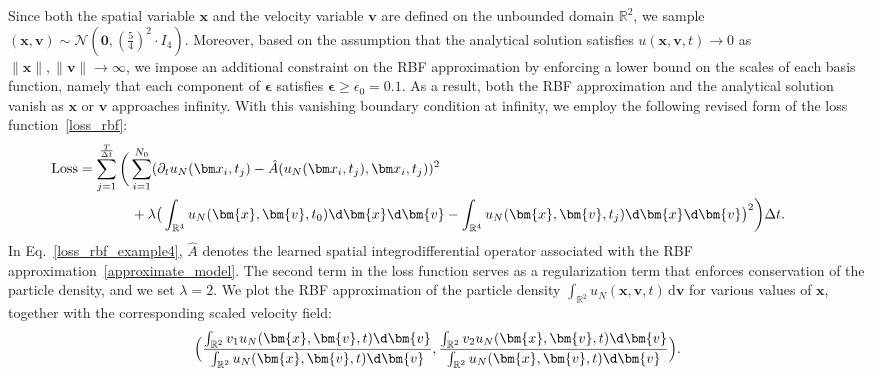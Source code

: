 \begin{example}
Since both the spatial variable $\bm{x}$ and the velocity variable $\bm{v}$ are defined on the unbounded domain $\mathbb{R}^2$, we sample $(\bm{x},\bm{v}) \sim \mathcal{N}(\bm{0}, (\frac{5}{4})^2\cdot I_4)$. Moreover, based on the assumption that the analytical solution satisfies $u(\bm{x},\bm{v},t) \to 0$ as $\|\bm{x}\|,\|\bm{v}\| \to \infty$, we impose an additional constraint on the RBF approximation by enforcing a lower bound on the scales of each basis function, namely that each component of $\bm{\epsilon}$ satisfies $\bm{\epsilon} \ge \epsilon_0 = 0.1$. As a result, both the RBF approximation and the analytical solution vanish as $\bm{x}$ or $\bm{v}$ approaches infinity. With this vanishing boundary condition at infinity, we employ the following revised form of the loss function~\eqref{loss_rbf}:
 \begin{equation}
 \begin{aligned}
     &\hspace{-1cm}\text{Loss} = \sum_{j=1}^{\frac{T}{\Delta t}}\bigg(\sum_{i=1}^{N_0} (\partial_tu_N(\bm x_i, t_j) - \hat{A}(u_N(\bm x_i, t_j), \bm x_i, t_j))^2\\&\hspace{1cm}+ \lambda \big(\int_{\mathbb{R}^4} u_N(\bm{x}, \bm{v},t_0)\d \bm{x}\d\bm{v} - \int_{\mathbb{R}^4} u_N(\bm{x}, \bm{v},t_j)\d \bm{x}\d\bm{v}\big)^2\bigg)\Delta t.%
     \end{aligned}
    \label{loss_rbf_example4}
 \end{equation}
 In Eq.~\eqref{loss_rbf_example4}, $\hat{A}$ denotes the learned spatial integrodifferential operator associated with the RBF approximation~\eqref{approximate_model}. The second term in the loss function serves as a regularization term that enforces conservation of the particle density, and we set $\lambda=2$. We plot the RBF approximation of the particle density $\int_{\mathbb{R}^2} u_N(\bm{x}, \bm{v}, t)\,\mathrm{d}\bm{v}$ for various values of $\bm{x}$, together with the corresponding scaled velocity field:
\begin{equation}
    \Big(\frac{\int_{\mathbb{R}^2}v_1u_N(\bm{x}, \bm{v}, t)\d\bm{v}}{\int_{\mathbb{R}^2}u_N(\bm{x}, \bm{v}, t)\d\bm{v}}, \frac{\int_{\mathbb{R}^2}v_2u_N(\bm{x}, \bm{v}, t)\d\bm{v}}{\int_{\mathbb{R}^2}u_N(\bm{x}, \bm{v}, t)\d\bm{v}}\Big).
\label{weighted_velocity}
\end{equation}





\end{example}
